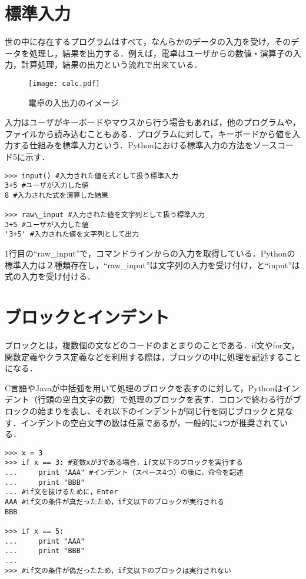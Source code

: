 \section{標準入力}
世の中に存在するプログラムはすべて，なんらかのデータの入力を受け，そのデータを処理し，結果を出力する．例えば，電卓はユーザからの数値・演算子の入力，計算処理，結果の出力という流れで出来ている．


\begin{figure}[htbp]
\begin{center}
\texttt{[image: calc.pdf]}
\caption{電卓の入出力のイメージ}
\label{fig:fig2}
\end{center}
\end{figure}


入力はユーザがキーボードやマウスから行う場合もあれば，他のプログラムや，ファイルから読み込むこともある．プログラムに対して，キーボードから値を入力する仕組みを標準入力という．Pythonにおける標準入力の方法をソースコード5に示す．


\begin{lstlisting}[caption=標準入力,label=std_input]
>>> input() #入力された値を式として扱う標準入力
3+5 #ユーザが入力した値
8 #入力された式を演算した結果

>>> raw\_input #入力された値を文字列として扱う標準入力
3+5 #ユーザが入力した値
'3+5' #入力された値を文字列として出力
\end{lstlisting}


1行目の``raw\_input''で，コマンドラインからの入力を取得している．Pythonの標準入力は２種類存在し，``raw\_input''は文字列の入力を受け付け，と``input''は式の入力を受け付ける．


\section{ブロックとインデント}
ブロックとは，複数個の文などのコードのまとまりのことである．if文やfor文，関数定義やクラス定義などを利用する際は，ブロックの中に処理を記述することになる．

C言語やJavaが中括弧を用いて処理のブロックを表すのに対して，Pythonはインデント（行頭の空白文字の数）で処理のブロックを表す．コロンで終わる行がブロックの始まりを表し、それ以下のインデントが同じ行を同じブロックと見なす．インデントの空白文字の数は任意であるが，一般的に4つが推奨されている．

\begin{lstlisting}[caption=インデント,label=indent]
>>> x = 3 
>>> if x == 3: #変数xが3である場合，if文以下のブロックを実行する
...     print "AAA" #インデント（スペース4つ）の後に，命令を記述
...     print "BBB" 
... #if文を抜けるために，Enter
AAA #if文の条件が真だったため，if文以下のブロックが実行される
BBB

>>> if x == 5: 
...     print "AAA" 
...     print "BBB"
...
>>> #if文の条件が偽だったため，if文以下のブロックは実行されない
\end{lstlisting}


